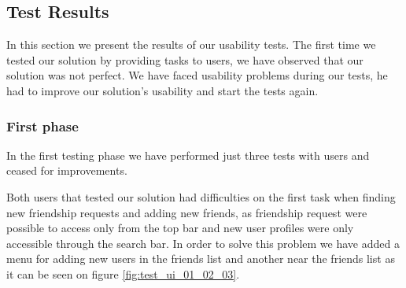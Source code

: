   \subsection{Test Results}

In this section we present the results of our usability tests. The first time we tested our solution by providing tasks to users, we have observed that our solution was not perfect. We have faced usability problems during our tests, he had to improve our solution's usability and start the tests again.

  \subsubsection {First phase}

In the first testing phase we have performed just three tests with users and ceased for improvements. 

Both users that tested our solution had difficulties on the first task when finding new friendship requests and adding new friends, as friendship request were possible to access only from the top bar and new user profiles were only accessible through the search bar. In order to solve this problem we have added a menu for adding new users in the friends list and another near the friends list as it can be seen on figure \ref{fig:test_ui_01_02_03}.

